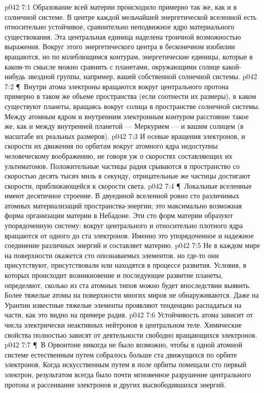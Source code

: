 \vs p042 7:1 Образование всей материи происходило примерно так же, как и в солнечной системе. В центре каждой мельчайшей энергетической вселенной есть относительно устойчивое, сравнительно неподвижное ядро материального существования. Эта центральная единица наделена троичной возможностью выражения. Вокруг этого энергетического центра в бесконечном изобилии вращаются, но по колеблющимся контурам, энергетические единицы, которые в каком\hyp{}то смысле можно сравнить с планетами, окружающими солнце какой\hyp{}нибудь звездной группы, например, вашей собственной солнечной системы.
\vs p042 7:2 \P\ Внутри атома электроны вращаются вокруг центрального протона примерно в таком же объеме пространства (если соотнести их размеры), в каком существуют планеты, вращаясь вокруг солнца в пространстве солнечной системы. Между атомным ядром и внутренним электронным контуром расстояние такое же, как и между внутренней планетой --- Меркурием --- и вашим солнцем (в масштабе их реальных размеров).
\vs p042 7:3 И осевые вращения электронов, и скорости их движения по орбитам вокруг атомного ядра недоступны человеческому воображению, не говоря уж о скоростях составляющих их ультиматонов. Положительные частицы радия срываются в пространство со скоростью десять тысяч миль в секунду, отрицательные же частицы достигают скорости, приближающейся к скорости света.
\vs p042 7:4 \P\ Локальные вселенные имеют десятичное строение. В двуединой вселенной ровно сто различимых атомных материализаций пространства\hyp{}энергии; это максимально возможная форма организации материи в Небадоне. Эти сто форм материи образуют упорядоченную систему: вокруг центрального и относительно плотного ядра вращаются от одного до ста электронов. Именно это упорядоченное и надежное соединение различных энергий и составляет материю.
\vs p042 7:5 Не в каждом мире на поверхности окажется сто опознаваемых элементов, но где\hyp{}то они присутствуют, присутствовали или находятся в процессе развития. Условия, в которых происходит возникновение и последующее развитие планеты, определяют, сколько из ста атомных типов можно будет впоследствии выявить. Более тяжелые атомы на поверхности многих миров не обнаруживаются. Даже на Урантии известные тяжелые элементы проявляют тенденцию распадаться на части, как это видно на примере радия.
\vs p042 7:6 Устойчивость атома зависит от числа электрически неактивных нейтронов в центральном теле. Химические свойства полностью зависят от деятельности свободно вращающихся электронов.
\vs p042 7:7 \P\ В Орвонтоне никогда не было возможно, чтобы в одной атомной системе естественным путем собралось больше ста движущихся по орбите электронов. Когда искусственным путем в поле орбиты помещали сто первый электрон, результатом всегда было почти мгновенное разрушение центрального протона и рассеивание электронов и других высвободившихся энергий.
